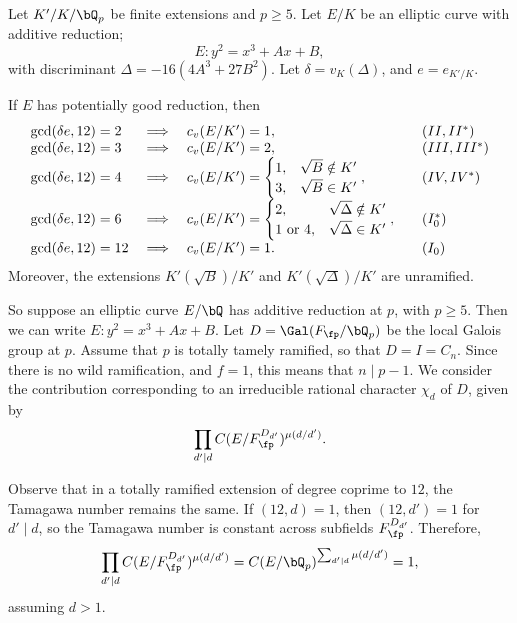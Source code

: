 \begin{lemma}
    Let $K' /K / \bQ_p$ be finite extensions and $p \geq 5$. Let $E / K$ be an elliptic curve with additive reduction; 
    \[ E \colon y^2 = x^3 + Ax + B, \]
    with discriminant $\Delta = -16(4 A^3 + 27 B^2)$. Let $\delta = v_K(\Delta)$, and $e = e_{K' / K}$.

    If $E$ has potentially good reduction, then 
        \[
        \begin{array}{l l l l}
            \gcd(\delta e, 12) = 2 & \implies & c_v(E / K') = 1, & \quad (II, II^*) \\
            \gcd(\delta e, 12) = 3 & \implies & c_v(E / K') = 2, & \quad (III, III^*) \\
            \gcd(\delta e, 12) = 4 & \implies & c_v(E / K') = \begin{cases} 1, & \sqrt{B} \notin K'
                                \\ 3, & \sqrt{B} \in K' \end{cases}, & \quad (IV, IV^*) \\
            \gcd(\delta e, 12) = 6 & \implies & c_v(E / K') = \begin{cases} 2, & \sqrt{\Delta} \notin K'
                \\ 1 \ \text{or} \ 4, & \sqrt{\Delta} \in K' \end{cases}, & \quad (I_0^*) \\
            \gcd(\delta e, 12) = 12 & \implies & c_v(E / K') = 1. & \quad (I_0)
        \end{array}
        \]
    Moreover, the extensions $K'(\sqrt{B}) / K'$ and $K'(\sqrt{\Delta}) / K'$ are unramified.
\end{lemma}

So suppose an elliptic curve $E / \bQ$ has additive reduction at $p$, with $p \geq 5$. Then we can write $E \colon y^2 = x^3 + Ax + B$. Let $D = \Gal(F_{\fp} / \bQ_p)$ be the local Galois group at $p$. Assume that $p$ is totally tamely ramified, so that $D = I = C_n$. Since there is no wild ramification, and $f = 1$, this means that $n \mid p - 1$. We consider the contribution corresponding to an irreducible rational character $\chi_d$ of $D$, given by 
\begin{equation}\label{tam-contrib}
\prod_{d ' \mid d} C(E / F_{\fp}^{D_{d'}})^{\mu(d / d')}.
\end{equation}

Observe that in a totally ramified extension of degree coprime to $12$, the Tamagawa number remains the same. If $(12, d) = 1$, then $(12, d') = 1$ for $d' \mid  d$, so the Tamagawa number is constant across subfields $F_{\fp}^{D_{d'}}$. Therefore,
\[\prod_{d ' \mid d} C(E / F_{\fp}^{D_{d'}})^{\mu(d / d')} = C(E / \bQ_p)^{\sum_{d' \mid d} \mu(d / d')} = 1,\]
assuming $d > 1$. 


